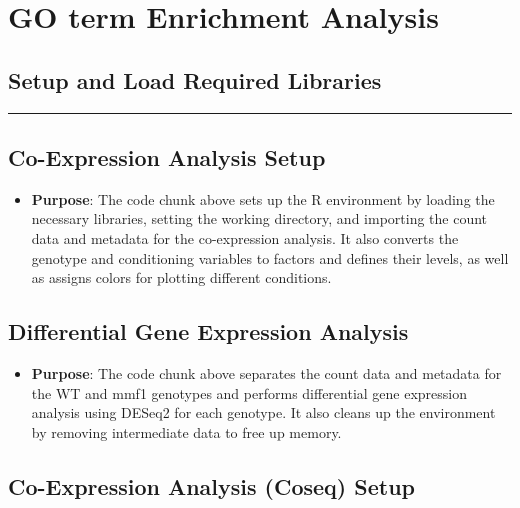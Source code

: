 \documentclass[
  11pt,
]{article}
\providecommand{\tightlist}{%
  \setlength{\itemsep}{0pt}\setlength{\parskip}{0pt}}\usepackage{longtable,booktabs,array}
\begin{document}
\section{GO term Enrichment Analysis}\label{go-term-enrichment-analysis}

\subsection{Setup and Load Required
Libraries}\label{setup-and-load-required-libraries}

\begin{center}\rule{0.5\linewidth}{0.5pt}\end{center}

\subsection{Co-Expression Analysis
Setup}\label{co-expression-analysis-setup}

\begin{itemize}
\tightlist
\item
  \textbf{Purpose}: The code chunk above sets up the R environment by
  loading the necessary libraries, setting the working directory, and
  importing the count data and metadata for the co-expression analysis.
  It also converts the genotype and conditioning variables to factors
  and defines their levels, as well as assigns colors for plotting
  different conditions.
\end{itemize}

\subsection{Differential Gene Expression
Analysis}\label{differential-gene-expression-analysis}

\begin{itemize}
\tightlist
\item
  \textbf{Purpose}: The code chunk above separates the count data and
  metadata for the WT and mmf1 genotypes and performs differential gene
  expression analysis using DESeq2 for each genotype. It also cleans up
  the environment by removing intermediate data to free up memory.
\end{itemize}

\subsection{Co-Expression Analysis (Coseq)
Setup}\label{co-expression-analysis-coseq-setup}
\end{document}
